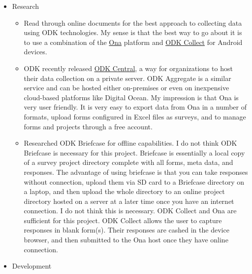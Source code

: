 \documentclass[]{article}
\providecommand{\tightlist}{%
  \setlength{\itemsep}{0pt}\setlength{\parskip}{0pt}}
\begin{document}
\begin{itemize}
\tightlist
\item
  Research

  \begin{itemize}
  \tightlist
  \item
    Read through online documents for the best approach to collecting
    data using ODK technologies. My sense is that the best way to go
    about it is to use a combination of the
    \href{https://ona.io/about-us.html}{Ona} platform and
    \href{https://docs.opendatakit.org/collect-intro/}{ODK Collect} for
    Android devices.
  \item
    ODK recently released
    \href{https://docs.opendatakit.org/central-intro/}{ODK Central}, a
    way for organizations to host their data collection on a private
    server. ODK Aggregate is a similar service and can be hosted either
    on-premises or even on inexpensive cloud-based platforms like
    Digital Ocean. My impression is that Ona is very user friendly. It
    is very easy to export data from Ona in a number of formats, upload
    forms configured in Excel files as surveys, and to manage forms and
    projects through a free account.
  \item
    Researched ODK Briefcase for offline capabilities. I do not think
    ODK Briefcase is necessary for this project. Briefcase is
    essentially a local copy of a survey project directory complete with
    all forms, meta data, and responses. The advantage of using
    briefcase is that you can take responses without connection, upload
    them via SD card to a Briefcase directory on a laptop, and then
    upload the whole directory to an online project directory hosted on
    a server at a later time once you have an internet connection. I do
    not think this is necessary. ODK Collect and Ona are sufficient for
    this project. ODK Collect allows the user to capture responses in
    blank form(s). Their responses are cashed in the device browser, and
    then submitted to the Ona host once they have online connection.
  \end{itemize}
\item
  Development


\end{itemize}
\end{document}
